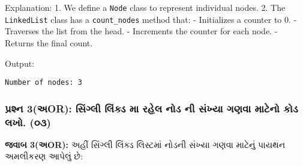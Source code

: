 Explanation: 1. We define a \texttt{Node} class to represent individual
nodes. 2. The \texttt{LinkedList} class has a \texttt{count\_nodes}
method that: - Initializes a counter to 0. - Traverses the list from the
head. - Increments the counter for each node. - Returns the final count.

Output:

\begin{verbatim}
Number of nodes: 3
\end{verbatim}

\hypertarget{uxaaauxab0uxab6uxaa8-3uxa85or-uxab8uxa97uxab2-uxab2uxa95uxaa1-uxaae-uxab0uxab9uxab2-uxaa8uxaa1-uxaa8-uxab8uxa96uxaaf-uxa97uxaa3uxab5-uxaaeuxa9fuxaa8-uxa95uxaa1-uxab2uxa96.-uxae6uxae9}{%
\subsubsection{પ્રશ્ન 3(અOR): સિંગ્લી લિંક્ડ મા રહેલ નોડ ની સંખ્યા ગણવા માટેનો કોડ
લખો.
(૦૩)}\label{uxaaauxab0uxab6uxaa8-3uxa85or-uxab8uxa97uxab2-uxab2uxa95uxaa1-uxaae-uxab0uxab9uxab2-uxaa8uxaa1-uxaa8-uxab8uxa96uxaaf-uxa97uxaa3uxab5-uxaaeuxa9fuxaa8-uxa95uxaa1-uxab2uxa96.-uxae6uxae9}}

\textbf{જવાબ 3(અOR):} અહીં સિંગ્લી લિંક્ડ લિસ્ટમાં નોડની સંખ્યા ગણવા માટેનું પાયથન
અમલીકરણ આપેલું છે:

\begin{Shaded}
\begin{Highlighting}[]
     \NormalTok{(}
        \OperatorTok{=}
         \OperatorTok{=} 

     \NormalTok{(}\NormalTok{):}
        \OperatorTok{=} 

    \NormalTok{):}
\OperatorTok{=} 
\OperatorTok{=} 
\OperatorTok{+=} 
\OperatorTok{=}

\OperatorTok{=}
\OperatorTok{=}\NormalTok{)}
 \OperatorTok{=}\NormalTok{)}
 \OperatorTok{=}\NormalTok{)}

\NormalTok{(}
\end{Highlighting}
\end{Shaded}


